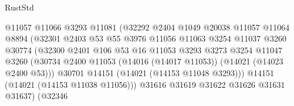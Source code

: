 \begin{lexlean}{RustStd}
\begin{coremodule}
                                        @11057
                                        @11066
                                        @3293
                                        @11081
                                        (@32292
                                          @2404
                                          @1049
                                          @20038
                                          @11057
                                          @11064
                                          @8894
                                          (@32301
                                            @2403
                                            @53
                                            @55
                                            @3976
                                            @11056
                                            @11063
                                            @3254
                                            @11037
                                            @3260
                                            @30774
                                            (@32300
                                              @2401
                                              @106
                                              @53
                                              @16
                                              @11053
                                              @3293
                                              @3273
                                              @3254
                                              @11047
                                              @3260
                                              (@30734
                                                @2400
                                                @11053
                                                (@14016 (@14017 @11053))
                                                (@14021 (@14023 @2400 @53)))
                                              @30701
                                              @14151
                                              (@14021 (@14153 @11048 @3293)))
                                            @14151
                                            (@14021 (@14153 @11038 @11056)))
                                          @31616
                                          @31619
                                          @31622
                                          @31626
                                          @31631
                                          @31637)
                                        (@32346

\end{coremodule}
\end{lexlean}
